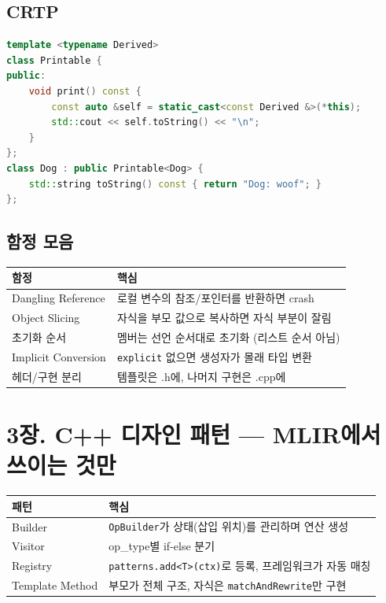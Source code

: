 \documentclass[11pt,a4paper]{article}
\begin{document}
\subsection{CRTP}
\begin{lstlisting}[language=C++]
template <typename Derived>
class Printable {
public:
    void print() const {
        const auto &self = static_cast<const Derived &>(*this);
        std::cout << self.toString() << "\n";
    }
};
class Dog : public Printable<Dog> {
    std::string toString() const { return "Dog: woof"; }
};
\end{lstlisting}

\subsection{함정 모음}
\begin{longtable}{p{4cm}p{9cm}}
\toprule
함정 & 핵심 \\
\midrule
Dangling Reference & 로컬 변수의 참조/포인터를 반환하면 crash \\
Object Slicing & 자식을 부모 값으로 복사하면 자식 부분이 잘림 \\
초기화 순서 & 멤버는 선언 순서대로 초기화 (리스트 순서 아님) \\
Implicit Conversion & \texttt{explicit} 없으면 생성자가 몰래 타입 변환 \\
헤더/구현 분리 & 템플릿은 .h에, 나머지 구현은 .cpp에 \\
\bottomrule
\end{longtable}

\newpage

\section{3장. C++ 디자인 패턴 --- MLIR에서 쓰이는 것만}

\begin{longtable}{p{4cm}p{9cm}}
\toprule
패턴 & 핵심 \\
\midrule
Builder & \texttt{OpBuilder}가 상태(삽입 위치)를 관리하며 연산 생성 \\
Visitor & op\_type별 if-else 분기 \\
Registry & \texttt{patterns.add<T>(ctx)}로 등록, 프레임워크가 자동 매칭 \\
Template Method & 부모가 전체 구조, 자식은 \texttt{matchAndRewrite}만 구현 \\
\bottomrule
\end{longtable}
\end{document}
